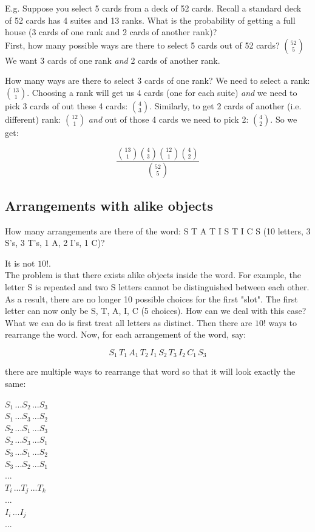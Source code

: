 \documentclass[12pt, letterpaper]{article}
\begin{document}
E.g. Suppose you select 5 cards from a deck of 52 cards. Recall a standard deck of 52 cards has 4 suites and 13 ranks. What is the probability of getting a full house (3 cards of one rank and 2 cards of another rank)?\\

First, how many possible ways are there to select 5 cards out of 52 cards? \(52 \choose 5\)\\

We want 3 cards of one rank \emph{and} 2 cards of another rank. 

How many ways are there to select 3 cards of one rank? We need to select a rank: \(13 \choose 1\). Choosing a rank will get us 4 cards (one for each suite) \emph{and} we need to pick 3 cards of out these 4 cards: \(4 \choose 3\). Similarly, to get 2 cards of another (i.e. different) rank: \(12 \choose 1\) \emph{and} out of those 4 cards we need to pick 2: \(4 \choose 2\). So we get:

\[
\frac{{{13 \choose 1}{4 \choose 3}{12 \choose 1}{4 \choose 2}}}{{52 \choose 5}}
\]

\subsection{Arrangements with alike objects}

How many arrangements are there of the word: S T A T I S T I C S (10 letters, 3 S's, 3 T's, 1 A, 2 I's, 1 C)?

It is not \(10!\).\\

The problem is that there exists alike objects inside the word. For example, the letter S is repeated and two S letters cannot be distinguished between each other. As a result, there are no longer 10 possible choices for the first "slot". The first letter can now only be S, T, A, I, C (5 choices). How can we deal with this case?\\

What we can do is first treat all letters as distinct. Then there are \(10!\) ways to rearrange the word. Now, for each arrangement of the word, say:

\[
S_1 \, T_1 \, A_1 \, T_2 \, I_1 \, S_2 \, T_3 \, I_2 \, C_1 \, S_3
\]

there are multiple ways to rearrange that word so that it will look exactly the same:

\begin{center}
\(S_1 \,... S_2 \,... S_3\)\\
\(S_1 \,... S_3 \,... S_2\)\\
\(S_2 \,... S_1 \,... S_3\)\\
\(S_2 \,... S_3 \,... S_1\)\\
\(S_3 \,... S_1 \,... S_2\)\\
\(S_3 \,... S_2 \,... S_1\)\\
...\\
\(T_i \,... T_j \,... T_k\)\\
...\\
\(I_i \,... I_j\)\\
...\\
\end{center}
\end{document}
